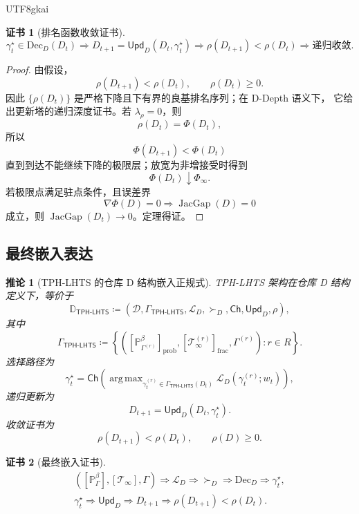 \documentclass[12pt]{article}
\newtheorem{corollary}{推论}[section]
\newtheorem{Certificate}{证书}[section]
\newcommand{\TPHLHTS}{\ensuremath{\mathsf{TPH\mbox{-}LHTS}}}
\newcommand{\DefEq}{\coloneqq}
\DeclareMathOperator{\JacGap}{JacGap}
\DeclareMathOperator*{\argmax}{arg\,max}
\begin{document}
\begin{CJK*}{UTF8}{gkai}
\begin{Certificate}[排名函数收敛证书]
\[
\boxed{
\gamma_t^\star\in\mathrm{Dec}_D(D_t)
\Rightarrow
D_{t+1}=\mathsf{Upd}_D(D_t,\gamma_t^\star)
\Rightarrow
\rho(D_{t+1})<\rho(D_t)
\Rightarrow
\text{递归收敛}.
}
\]
\end{Certificate}

\begin{proof}
由假设，
\[
\rho(D_{t+1})<\rho(D_t),
\qquad
\rho(D_t)\ge0.
\]
因此 \(\{\rho(D_t)\}\) 是严格下降且下有界的良基排名序列；在 D-Depth 语义下，
它给出更新塔的递归深度证书。若 \(\lambda_\rho=0\)，则
\[
\rho(D_t)=\Phi(D_t),
\]
所以
\[
\Phi(D_{t+1})<\Phi(D_t)
\]
直到到达不能继续下降的极限层；放宽为非增接受时得到
\[
\Phi(D_t)\downarrow\Phi_\infty.
\]
若极限点满足驻点条件，且误差界
\[
\nabla\Phi(D)=0\Rightarrow\JacGap(D)=0
\]
成立，则 \(\JacGap(D_t)\to0\)。定理得证。
\end{proof}

\subsection{最终嵌入表达}
\label{subsec:repo-d-final-embedding-statement}

\begin{corollary}[TPH-LHTS 的仓库 D 结构嵌入正规式]
TPH-LHTS 架构在仓库 D 结构定义下，等价于
\[
\boxed{
\mathbb D_{\TPHLHTS}
\DefEq
\left(
\mathcal D,
\Gamma_{\TPHLHTS},
\mathcal L_D,
\succ_D,
\mathsf{Ch},
\mathsf{Upd}_D,
\rho
\right),
}
\]
其中
\[
\boxed{
\Gamma_{\TPHLHTS}
\DefEq
\left\{
\left(
[\mathbb P_{\Gamma^{(r)}}^\beta]_{\mathrm{prob}},
[\mathcal T_\infty^{(r)}]_{\mathrm{frac}},
\Gamma^{(r)}
\right):
r\in R
\right\}.
}
\]
选择路径为
\[
\boxed{
\gamma_t^\star
=
\mathsf{Ch}
\left(
\argmax_{\gamma_t^{(r)}\in\Gamma_{\TPHLHTS}(D_t)}
\mathcal L_D(\gamma_t^{(r)};w_t)
\right),
}
\]
递归更新为
\[
\boxed{
D_{t+1}=\mathsf{Upd}_D(D_t,\gamma_t^\star).
}
\]
收敛证书为
\[
\boxed{
\rho(D_{t+1})<\rho(D_t),
\qquad
\rho(D)\ge0.
}
\]
\end{corollary}

\begin{Certificate}[最终嵌入证书]
\[
\boxed{
\begin{gathered}
([\mathbb P_\Gamma^\beta],[\mathcal T_\infty],\Gamma)
\Rightarrow
\mathcal L_D
\Rightarrow
\succ_D
\Rightarrow
\mathrm{Dec}_D
\Rightarrow
\gamma_t^\star,
\\
\gamma_t^\star
\Rightarrow
\mathsf{Upd}_D
\Rightarrow
D_{t+1}
\Rightarrow
\rho(D_{t+1})<\rho(D_t).
\end{gathered}
}
\]
\end{Certificate}


\end{CJK*}
\end{document}
